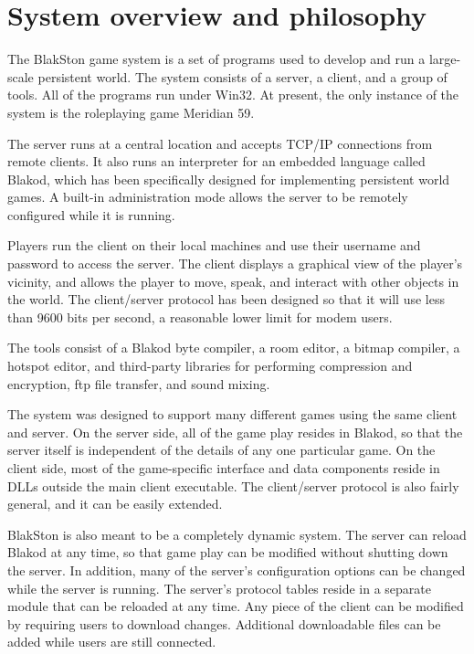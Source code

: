 \chapter{System overview and philosophy}

The BlakSton game system is a set of programs used to develop and run
a large-scale persistent world.  The system consists of a server, a
client, and a group of tools.  All of the programs run under Win32.
At present, the only instance of the system is the roleplaying game
Meridian 59.

The server runs at a central location and accepts TCP/IP connections
from remote clients.  It also runs an interpreter for an embedded
language called Blakod, which has been specifically designed for
implementing persistent world games.  A built-in administration mode
allows the server to be remotely configured while it is running.

Players run the client on their local machines and use their username
and password to access the server.  The client displays a graphical
view of the player's vicinity, and allows the player to move, speak,
and interact with other objects in the world.  The client/server
protocol has been designed so that it will use less than 9600 bits per
second, a reasonable lower limit for modem users.

The tools consist of a Blakod byte compiler, a room editor, a bitmap
compiler, a hotspot editor, and third-party libraries for performing
compression and encryption, ftp file transfer, and sound mixing.

The system was designed to support many different games using the same
client and server.  On the server side, all of the game play resides
in Blakod, so that the server itself is independent of the details of
any one particular game.  On the client side, most of the
game-specific interface and data components reside in DLLs outside the
main client executable.  The client/server protocol is also fairly
general, and it can be easily extended.

BlakSton is also meant to be a completely dynamic system.  The server
can reload Blakod at any time, so that game play can be modified
without shutting down the server.  In addition, many of the server's
configuration options can be changed while the server is running.  The
server's protocol tables reside in a separate module that can be
reloaded at any time.  Any piece of the client can be modified by
requiring users to download changes.  Additional downloadable files
can be added while users are still connected.

